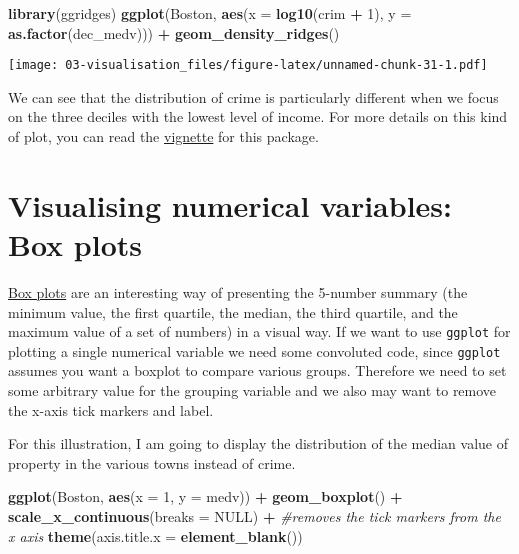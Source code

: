 \documentclass[
]{book}
\newenvironment{Shaded}{\begin{snugshade}}{\end{snugshade}}
\newcommand{\AttributeTok}[1]{\textcolor[rgb]{0.13,0.29,0.53}{#1}}
\newcommand{\CommentTok}[1]{\textcolor[rgb]{0.56,0.35,0.01}{\textit{#1}}}
\newcommand{\ConstantTok}[1]{\textcolor[rgb]{0.56,0.35,0.01}{#1}}
\newcommand{\DecValTok}[1]{\textcolor[rgb]{0.00,0.00,0.81}{#1}}
\newcommand{\FunctionTok}[1]{\textcolor[rgb]{0.13,0.29,0.53}{\textbf{#1}}}
\newcommand{\NormalTok}[1]{#1}
\newcommand{\SpecialCharTok}[1]{\textcolor[rgb]{0.81,0.36,0.00}{\textbf{#1}}}
\begin{document}
\begin{Shaded}
\begin{Highlighting}[]
\FunctionTok{library}\NormalTok{(ggridges)}
\FunctionTok{ggplot}\NormalTok{(Boston, }\FunctionTok{aes}\NormalTok{(}\AttributeTok{x =} \FunctionTok{log10}\NormalTok{(crim }\SpecialCharTok{+} \DecValTok{1}\NormalTok{), }\AttributeTok{y =} \FunctionTok{as.factor}\NormalTok{(dec\_medv))) }\SpecialCharTok{+} \FunctionTok{geom\_density\_ridges}\NormalTok{()}
\end{Highlighting}
\end{Shaded}

\texttt{[image: 03-visualisation\_files/figure-latex/unnamed-chunk-31-1.pdf]}

We can see that the distribution of crime is particularly different when we focus on the three deciles with the lowest level of income. For more details on this kind of plot, you can read the \href{https://cran.r-project.org/web/packages/ggridges/vignettes/introduction.html}{vignette} for this package.

\section{Visualising numerical variables: Box plots}\label{visualising-numerical-variables-box-plots}

\href{http://tomhopper.me/2014/07/04/the-most-useful-data-plot-youve-never-used/}{Box plots} are an interesting way of presenting the 5-number summary (the minimum value, the first quartile, the median, the third quartile, and the maximum value of a set of numbers) in a visual way. If we want to use \texttt{ggplot} for plotting a single numerical variable we need some convoluted code, since \texttt{ggplot} assumes you want a boxplot to compare various groups. Therefore we need to set some arbitrary value for the grouping variable and we also may want to remove the x-axis tick markers and label.

For this illustration, I am going to display the distribution of the median value of property in the various towns instead of crime.

\begin{Shaded}
\begin{Highlighting}[]
\FunctionTok{ggplot}\NormalTok{(Boston, }\FunctionTok{aes}\NormalTok{(}\AttributeTok{x =} \DecValTok{1}\NormalTok{, }\AttributeTok{y =}\NormalTok{ medv)) }\SpecialCharTok{+} 
  \FunctionTok{geom\_boxplot}\NormalTok{() }\SpecialCharTok{+}
  \FunctionTok{scale\_x\_continuous}\NormalTok{(}\AttributeTok{breaks =} \ConstantTok{NULL}\NormalTok{) }\SpecialCharTok{+} \CommentTok{\#removes the tick markers from the x axis}
  \FunctionTok{theme}\NormalTok{(}\AttributeTok{axis.title.x =} \FunctionTok{element\_blank}\NormalTok{())}
\end{Highlighting}
\end{Shaded}
\end{document}
